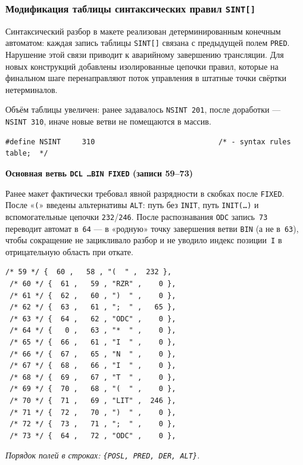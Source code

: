 \documentclass[a4paper,14pt]{extarticle}
\newcommand{\blocktitle}[1]{\par\needspace{4\baselineskip}\noindent\textbf{#1}\par\vspace{0.35\baselineskip}}
\begin{document}
\subsubsection*{Модификация таблицы синтаксических правил \texttt{SINT[]}}

Синтаксический разбор в макете реализован детерминированным конечным автоматом:
каждая запись таблицы \texttt{SINT[]} связана с предыдущей полем \texttt{PRED}.
Нарушение этой связи приводит к аварийному завершению трансляции. Для новых
конструкций добавлены изолированные цепочки правил, которые на финальном шаге
перенаправляют поток управления в штатные точки свёртки нетерминалов.

Объём таблицы увеличен: ранее задавалось \texttt{NSINT~201}, после доработки —
\texttt{NSINT~310}, иначе новые ветви не помещаются в массив.

\begin{lstlisting}[style=Cstyle,caption={Расширение массива правил},label=lst:nsint]
#define NSINT     310                             /* - syntax rules table;  */
\end{lstlisting}

\blocktitle{Основная ветвь \texttt{DCL \ldots BIN FIXED} (записи 59--73)}

Ранее макет фактически требовал явной разрядности в скобках после \texttt{FIXED}.
После «\texttt{(}» введены альтернативы \texttt{ALT}: путь без \texttt{INIT},
путь \texttt{INIT(\ldots)} и вспомогательные цепочки \texttt{232}/\texttt{246}.
После распознавания \texttt{ODC} запись~\texttt{73} переводит автомат
в~\texttt{64} — в «родную» точку завершения ветви \texttt{BIN} (а не
в~\texttt{63}), чтобы сокращение не зацикливало разбор и не уводило индекс
позиции~\texttt{I} в отрицательную область при откате.

\begin{lstlisting}[style=Cstyle,caption={Записи 59--73: разбор \texttt{BIN FIXED}},label=lst:sint_bin]
 /* 59 */ {  60 ,   58 , "(  " ,  232 },
 /* 60 */ {  61 ,   59 , "RZR" ,    0 },
 /* 61 */ {  62 ,   60 , ")  " ,    0 },
 /* 62 */ {  63 ,   61 , ";  " ,   65 },
 /* 63 */ {  64 ,   62 , "ODC" ,    0 },
 /* 64 */ {   0 ,   63 , "*  " ,    0 },
 /* 65 */ {  66 ,   61 , "I  " ,    0 },
 /* 66 */ {  67 ,   65 , "N  " ,    0 },
 /* 67 */ {  68 ,   66 , "I  " ,    0 },
 /* 68 */ {  69 ,   67 , "T  " ,    0 },
 /* 69 */ {  70 ,   68 , "(  " ,    0 },
 /* 70 */ {  71 ,   69 , "LIT" ,  246 },
 /* 71 */ {  72 ,   70 , ")  " ,    0 },
 /* 72 */ {  73 ,   71 , ";  " ,    0 },
 /* 73 */ {  64 ,   72 , "ODC" ,    0 },
\end{lstlisting}
\textit{Порядок полей в строках: \texttt{\{POSL, PRED, DER, ALT\}}.}
\end{document}
